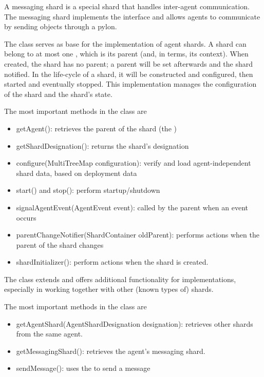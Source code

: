 \documentclass{article}
\begin{document}
A messaging shard is a special shard that handles inter-agent communication. The messaging shard implements the  interface and allows agents to communicate by sending  objects through a pylon.

The  class serves as base for the implementation of agent shards. A shard can belong to at most one , which is its parent (and, in  terms, its context). When created, the shard has no parent; a parent will be set afterwards and the shard notified. In the life-cycle of a shard, it will be constructed and configured, then started and eventually stopped. This implementation manages the configuration of the shard and the shard's state.

The most important methods in the  class are
\begin{itemize}
    \item getAgent(): retrieves the parent of the shard (the )
    \item getShardDesignation(): returns the shard's designation
    \item configure(MultiTreeMap configuration): verify and load agent-independent shard data, based on deployment data
    \item start() and stop(): perform startup/shutdown
    \item signalAgentEvent(AgentEvent event): called by the parent when an event occurs
    \item parentChangeNotifier(ShardContainer oldParent): performs actions when the parent of the shard changes
    \item shardInitializer(): perform actions when the shard is created.
\end{itemize}

The  class extends   and offers additional functionality for  implementations, especially in working together with other (known types of) shards.

The most important methods in the  class are
\begin{itemize}
    \item getAgentShard(AgentShardDesignation designation): retrieves other shards from the same agent.
    \item getMessagingShard(): retrieves the agent's messaging shard.
    \item sendMessage(): uses the  to send a message
\end{itemize}
\end{document}
